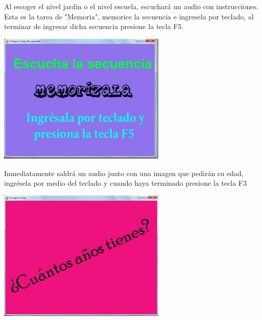 \documentclass[12pt]{report}
\begin{document}

Al escoger el nivel jardin o el nivel escuela, escuchará un audio con instrucciones. Esta es la tarea de "Memoria", memorice la secuencia e ingresela por teclado, al terminar de ingresar dicha secuencia presione la tecla F5.

	\begin{center}
		\begingroup
			\includegraphics[width=0.6\textwidth]{imagenes_usuario/memoriza}
		\endgroup
	\end{center}


Inmediatamente saldrá un audio junto con una imagen que pedirán su edad, ingrésela por medio del teclado y cuando haya terminado presione la tecla F3

	\begin{center}
		\begingroup
			\includegraphics[width=0.6\textwidth]{imagenes_usuario/anios.jpg}
		\endgroup
	\end{center}


\end{document}
